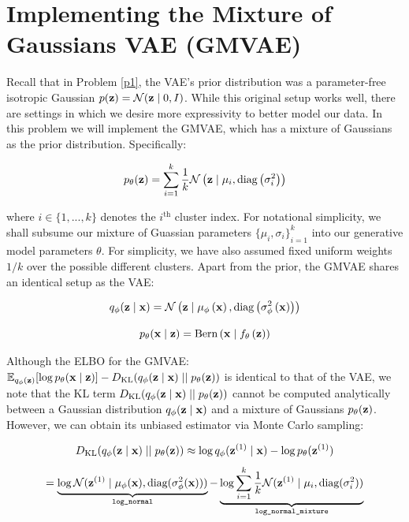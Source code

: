 \section{Implementing the Mixture of Gaussians VAE (GMVAE)}

Recall that in Problem \ref{p1}, the VAE’s prior distribution was a parameter-free isotropic Gaussian $p(\mathbf{z}) = \mathcal{N}(\mathbf{z} \mid 0,I)$. 
While this original setup works well, there are settings in which we desire more expressivity to better model our data. In this 
problem we will implement the GMVAE, which has a mixture of Gaussians as the prior distribution. Specifically:

\begin{equation} \label{eq:7}
    p_{\theta}(\mathbf{z}) = \sum\limits_{i=1}^{k} \frac{1}{k} \mathcal{N}\left(\mathbf{z} \mid \mu_i, \text{diag}\left(\sigma_i^2\right)\right)
\end{equation}

where $i \in \{1,...,k\}$ denotes the $i^{\text{th}}$ cluster index. For notational simplicity, we shall subsume our mixture of 
Guassian parameters ${\{\mu_i, \sigma_i\}}_{i=1}^{k}$ into our generative model parameters $\theta$. For simplicity, we have also 
assumed fixed uniform weights $1/k$ over the possible different clusters. Apart from the prior, the GMVAE shares an identical setup 
as the VAE:

\begin{equation} \label{eq:8}
    q_{\phi}(\mathbf{z} \mid \mathbf{x}) = \mathcal{N}\left(\mathbf{z} \mid \mu_{\phi}\left(\mathbf{x}\right), \text{diag}\left(\sigma_{\phi}^2\left(\mathbf{x}\right)\right)\right)
\end{equation}

\begin{equation} \label{eq:9}
    p_{\theta}(\mathbf{x} \mid \mathbf{z}) = \text{Bern}\left(\mathbf{x} \mid f_{\theta}\left(\mathbf{z}\right)\right)
\end{equation}

Although the ELBO for the GMVAE: $\mathbb{E}_{q_{\phi}(\mathbf{z})}[\log p_{\theta}(\mathbf{x} \mid \mathbf{z})] - D_{\text{KL}}(q_{\phi}(\mathbf{z} \mid \mathbf{x}) \mid\mid p_{\theta}(\mathbf{z}))$ is identical to 
that of the VAE, we note that the KL term $D_{\text{KL}}(q_{\phi}(\mathbf{z} \mid \mathbf{x}) \mid\mid p_{\theta}(\mathbf{z}))$ cannot be computed analytically 
between a Gaussian distribution $q_{\phi}(\mathbf{z} \mid \mathbf{x})$ and a mixture of Gaussians $p_{\theta}(\mathbf{z})$. However, we can obtain its 
unbiased estimator via Monte Carlo sampling:

\begin{equation} \label{eq:10}
    D_{\text{KL}}(q_{\phi}(\mathbf{z} \mid \mathbf{x}) \mid\mid p_{\theta}(\mathbf{z})) \approx \log q_{\phi}(\mathbf{z}^{(1)} \mid \mathbf{x}) - \log p_{\theta}(\mathbf{z}^{(1)})
\end{equation}
\begin{equation} \label{eq:11}
    = \underbrace{\log \mathcal{N}(\mathbf{z}^{(1)} \mid \mu_{\phi}(\mathbf{x}), \text{diag}(\sigma_{\phi}^2(\mathbf{x})))}_\text{\texttt{log\_normal}} - \underbrace{\log\sum\limits_{i=1}^{k} \frac{1}{k}\mathcal{N}(\mathbf{z}^{(1)}\mid\mu_i,\text{diag}(\sigma_i^2))}_\text{\texttt{log\_normal\_mixture}}
\end{equation}

